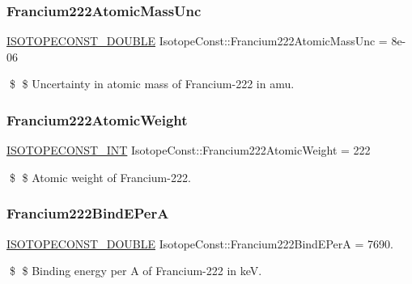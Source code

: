 \subsubsection{\texorpdfstring{Francium222\+Atomic\+Mass\+Unc}{Francium222AtomicMassUnc}}
{\footnotesize\ttfamily \mbox{\hyperlink{group___isotope_const-_macros_ga8f45a7272ce02c0b4c65c44636ed719a}{I\+S\+O\+T\+O\+P\+E\+C\+O\+N\+S\+T\+\_\+\+D\+O\+U\+B\+LE}} Isotope\+Const\+::\+Francium222\+Atomic\+Mass\+Unc = 8e-\/06}

\$ \$ Uncertainty in atomic mass of Francium-\/222 in amu. \mbox{\label{group___isotope_const-_francium-_fr222_gab172e070f3cbbb882350f44964c90c92}} 
\subsubsection{\texorpdfstring{Francium222\+Atomic\+Weight}{Francium222AtomicWeight}}
{\footnotesize\ttfamily \mbox{\hyperlink{group___isotope_const-_macros_ga5f18360b3e99483a35c32d789e62621c}{I\+S\+O\+T\+O\+P\+E\+C\+O\+N\+S\+T\+\_\+\+I\+NT}} Isotope\+Const\+::\+Francium222\+Atomic\+Weight = 222}

\$ \$ Atomic weight of Francium-\/222. \mbox{\label{group___isotope_const-_francium-_fr222_ga6f46f56e404d5788c97303c8d4b85851}} 
\subsubsection{\texorpdfstring{Francium222\+Bind\+E\+PerA}{Francium222BindEPerA}}
{\footnotesize\ttfamily \mbox{\hyperlink{group___isotope_const-_macros_ga8f45a7272ce02c0b4c65c44636ed719a}{I\+S\+O\+T\+O\+P\+E\+C\+O\+N\+S\+T\+\_\+\+D\+O\+U\+B\+LE}} Isotope\+Const\+::\+Francium222\+Bind\+E\+PerA = 7690.}

\$ \$ Binding energy per A of Francium-\/222 in keV. \mbox{\label{group___isotope_const-_francium-_fr222_ga5d1b682be770327c2a945e2e4597d1db}} 
